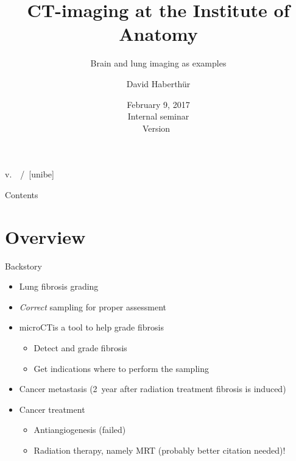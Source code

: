 \documentclass[draft,caption=numbered]{beamer}
\subtitle{Brain and lung imaging as examples}
\author[DH]{David Haberthür}
\institute{Institute of Anatomy\\Universität Bern}
\date{February 9, 2017\\Internal seminar\\Version~\gitAbbrevHash}
\newcommand{\uct}{\si{micro}CT}
\begin{document}
\title[\si{\micro}CT imaging at ana.unibe.ch]{\si{\micro}CT-imaging at the Institute of Anatomy} %

{%
	\hspace*{\fill}%
	\insertauthor%
	\hspace*{\fill}%
	\insertshorttitle%
	\hspace*{\fill}%
	v.~\gitAbbrevHash%
	\hspace*{\fill}%
	\insertpagenumber\,/\,\insertpresentationendpage%
	\hspace*{\fill}%
	\vskip2pt%
}
[unibe]

{
\begin{frame}
  \titlepage
\end{frame}
}
\addtocounter{framenumber}{1}

\begin{frame}{Contents}
	\tableofcontents
\end{frame}

\section{Overview}
\begin{frame}{Backstory}
    \begin{itemize}
        \item Lung fibrosis grading \cite{Ashcroft1988a}
        \item \emph{Correct} sampling for proper assessment
        \item \uct is a tool to help grade fibrosis
        \begin{itemize}
            \item Detect and grade fibrosis
            \item Get indications where to perform the sampling
        \end{itemize}
        \item Cancer metastasis (\SI{2}{year} after radiation treatment fibrosis is induced)
        \item Cancer treatment
        \begin{itemize}
            \item Antiangiogenesis (failed)
            \item Radiation therapy, namely MRT \cite{Bronnimann2016} (probably better citation needed)!
        \end{itemize}
    \end{itemize}
\end{frame}
\end{document}
